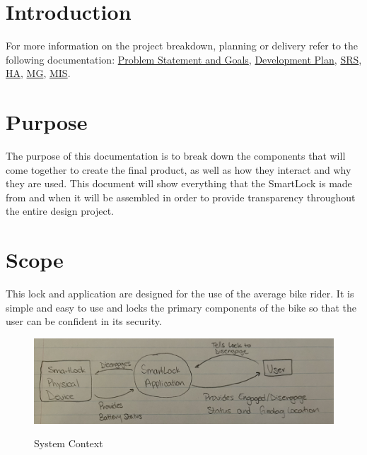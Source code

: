 \documentclass[12pt, titlepage]{article}
\begin{document}
\newpage


\listoffigures

\newpage


\section{Introduction}

For more information on the project breakdown, planning or delivery refer to the following documentation:
 \href{https://github.com/NevoAbigail/Capstone/blob/main/docs/ProblemStatementAndGoals/ProblemStatement.pdf}{Problem Statement and Goals},
 \href{https://github.com/NevoAbigail/Capstone/blob/main/docs/DevelopmentPlan/DevelopmentPlan.pdf}{Development Plan},
 \href{https://github.com/NevoAbigail/Capstone/blob/main/docs/SRS/SRS.pdf}{SRS},
 \href{https://github.com/NevoAbigail/Capstone/blob/main/docs/HazardAnalysis/HazardAnalysis.pdf}{HA},
 \href{https://github.com/NevoAbigail/Capstone/blob/main/docs/Design/SoftArchitecture/MG.pdf}{MG},
 \href{https://github.com/NevoAbigail/Capstone/blob/main/docs/Design/SoftDetailedDes/MIS.pdf}{MIS}.

\section{Purpose}
The purpose of this documentation is to break down the components that will come together to create the final product, as well as how they interact and why they are used. This document will show everything that the SmartLock is made from and when it will be assembled in order to provide transparency throughout the entire design project.



\section{Scope}

This lock and application are designed for the use of the average bike rider. It is simple and easy to use and locks the primary components of the bike so that the user can be confident in its security. 

 \begin{figure}[h!]
 \begin{center}
 {
  \includegraphics[width=0.9\linewidth]{System Context.png}
 }
 \caption{\label{System Context} System Context}
 \end{center}
 \end{figure}
\end{document}
